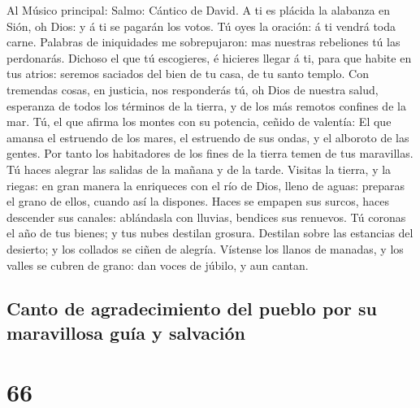  Al Músico principal: Salmo: Cántico de David. A ti es
plácida la alabanza en Sión, oh Dios: y á ti se pagarán los votos.
 Tú oyes la oración: á ti vendrá toda carne.
 Palabras de iniquidades me sobrepujaron: mas nuestras
rebeliones tú las perdonarás.  Dichoso el que tú
escogieres, é hicieres llegar á ti, para que habite en tus atrios:
seremos saciados del bien de tu casa, de tu santo templo. 
Con tremendas cosas, en justicia, nos responderás tú, oh Dios de nuestra
salud, esperanza de todos los términos de la tierra, y de los más
remotos confines de la mar.  Tú, el que afirma los montes
con su potencia, ceñido de valentía:  El que amansa el
estruendo de los mares, el estruendo de sus ondas, y el alboroto de las
gentes.  Por tanto los habitadores de los fines de la
tierra temen de tus maravillas. Tú haces alegrar las salidas de la
mañana y de la tarde.  Visitas la tierra, y la riegas: en
gran manera la enriqueces con el río de Dios, lleno de aguas: preparas
el grano de ellos, cuando así la dispones.  Haces se
empapen sus surcos, haces descender sus canales: ablándasla con lluvias,
bendices sus renuevos.  Tú coronas el año de tus bienes;
y tus nubes destilan grosura.  Destilan sobre las
estancias del desierto; y los collados se ciñen de alegría.
 Vístense los llanos de manadas, y los valles se cubren
de grano: dan voces de júbilo, y aun cantan.

\hypertarget{canto-de-agradecimiento-del-pueblo-por-su-maravillosa-guuxeda-y-salvaciuxf3n}{%
\subsection{Canto de agradecimiento del pueblo por su maravillosa guía y
salvación}\label{canto-de-agradecimiento-del-pueblo-por-su-maravillosa-guuxeda-y-salvaciuxf3n}}

\hypertarget{section-65}{%
\section{66}\label{section-65}}

